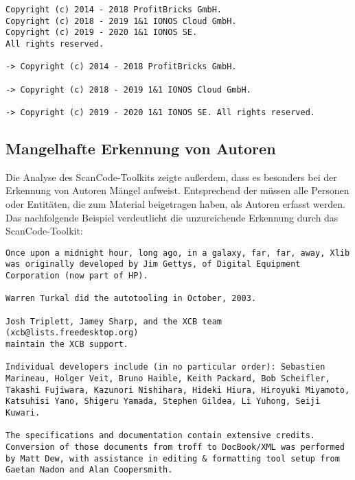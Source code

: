 \begin{lstlisting}[numbers=none, keepspaces=true]
Copyright (c) 2014 - 2018 ProfitBricks GmbH.
Copyright (c) 2018 - 2019 1&1 IONOS Cloud GmbH.
Copyright (c) 2019 - 2020 1&1 IONOS SE.
All rights reserved.

-> Copyright (c) 2014 - 2018 ProfitBricks GmbH.

-> Copyright (c) 2018 - 2019 1&1 IONOS Cloud GmbH.

-> Copyright (c) 2019 - 2020 1&1 IONOS SE. All rights reserved.
\end{lstlisting}


\subsection{Mangelhafte Erkennung von Autoren}

Die Analyse des ScanCode-Toolkits zeigte außerdem, dass es besonders bei der Erkennung von Autoren Mängel aufweist.
Entsprechend der  müssen alle Personen oder Entitäten, die zum Material beigetragen haben, als Autoren erfasst werden.
Das nachfolgende Beispiel verdeutlicht die unzureichende Erkennung durch das ScanCode-Toolkit:

\begin{lstlisting}[numbers=none, keepspaces=true]
Once upon a midnight hour, long ago, in a galaxy, far, far, away, Xlib
was originally developed by Jim Gettys, of Digital Equipment
Corporation (now part of HP).

Warren Turkal did the autotooling in October, 2003.

Josh Triplett, Jamey Sharp, and the XCB team (xcb@lists.freedesktop.org)
maintain the XCB support.

Individual developers include (in no particular order): Sebastien
Marineau, Holger Veit, Bruno Haible, Keith Packard, Bob Scheifler,
Takashi Fujiwara, Kazunori Nishihara, Hideki Hiura, Hiroyuki Miyamoto,
Katsuhisi Yano, Shigeru Yamada, Stephen Gildea, Li Yuhong, Seiji Kuwari.

The specifications and documentation contain extensive credits.
Conversion of those documents from troff to DocBook/XML was performed
by Matt Dew, with assistance in editing & formatting tool setup from
Gaetan Nadon and Alan Coopersmith.
\end{lstlisting}

